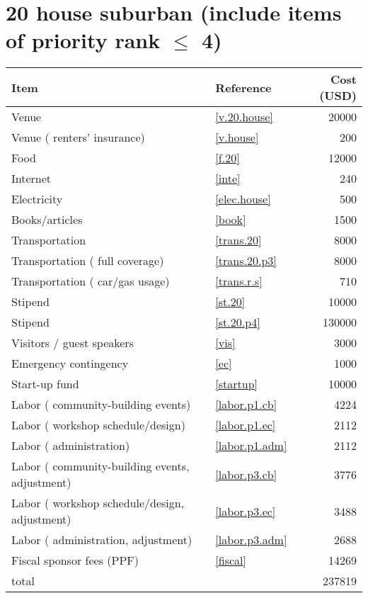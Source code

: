 \section*{20 house suburban (include items of priority rank $\leq$ 4)}
\begin{center}
\begin{tabular}{llr}
Item & Reference & Cost (USD) \\ \hline
Venue & \ref{v.20.house} & 20000 \\
Venue ( renters' insurance) & \ref{v.house} & 200 \\
Food & \ref{f.20} & 12000 \\
Internet & \ref{inte} & 240 \\
Electricity & \ref{elec.house} & 500 \\
Books/articles & \ref{book} & 1500 \\
Transportation & \ref{trans.20} & 8000 \\
Transportation ( full coverage) & \ref{trans.20.p3} & 8000 \\
Transportation ( car/gas usage) & \ref{trans.r.s} & 710 \\
Stipend & \ref{st.20} & 10000 \\
Stipend & \ref{st.20.p4} & 130000 \\
Visitors / guest speakers & \ref{vis} & 3000 \\
Emergency contingency & \ref{ec} & 1000 \\
Start-up fund & \ref{startup} & 10000 \\
Labor ( community-building events) & \ref{labor.p1.cb} & 4224 \\
Labor ( workshop schedule/design) & \ref{labor.p1.ec} & 2112 \\
Labor ( administration) & \ref{labor.p1.adm} & 2112 \\
Labor ( community-building events, adjustment) & \ref{labor.p3.cb} & 3776 \\
Labor ( workshop schedule/design, adjustment) & \ref{labor.p3.ec} & 3488 \\
Labor ( administration, adjustment) & \ref{labor.p3.adm} & 2688 \\
Fiscal sponsor fees (PPF) & \ref{fiscal} & 14269 \\ \hline
total &  & 237819
\end{tabular}
\end{center}
\newpage
